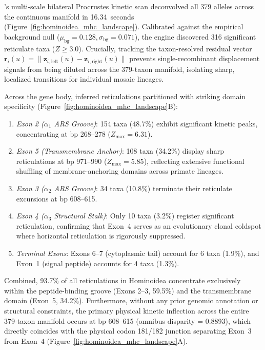 \RhizAeon's multi-scale bilateral Procrustes kinetic scan deconvolved all 379 alleles across the continuous manifold in 16.34~seconds (Figure~\ref{fig:hominoidea_mhc_landscape}).
Calibrated against the empirical background null ($\mu_{\mathrm{bg}} = 0.128, \sigma_{\mathrm{bg}} = 0.071$), the engine discovered 316 significant reticulate taxa ($Z \ge 3.0$).
Crucially, tracking the taxon-resolved residual vector $\mathbf{r}_i(u) = \|\mathbf{z}_{i, \mathrm{left}}(u) - \mathbf{z}_{i, \mathrm{right}}(u)\|$ prevents single-recombinant displacement signals from being diluted across the 379-taxon manifold, isolating sharp, localized transitions for individual mosaic lineages.

Across the gene body, inferred reticulations partitioned with striking domain specificity (Figure~\ref{fig:hominoidea_mhc_landscape}B):
\begin{enumerate}
    \item \textit{Exon 2 ($\alpha_1$ ARS Groove)}: 154 taxa (48.7\%) exhibit significant kinetic peaks, concentrating at bp 268--278 ($Z_{\max} = 6.31$).
    \item \textit{Exon 5 (Transmembrane Anchor)}: 108 taxa (34.2\%) display sharp reticulations at bp 971--990 ($Z_{\max} = 5.85$), reflecting extensive functional shuffling of membrane-anchoring domains across primate lineages.
    \item \textit{Exon 3 ($\alpha_2$ ARS Groove)}: 34 taxa (10.8\%) terminate their reticulate excursions at bp 608--615.
    \item \textit{Exon 4 ($\alpha_3$ Structural Stalk)}: Only 10 taxa (3.2\%) register significant reticulation, confirming that Exon~4 serves as an evolutionary clonal coldspot where horizontal reticulation is rigorously suppressed.
    \item \textit{Terminal Exons}: Exons 6--7 (cytoplasmic tail) account for 6 taxa (1.9\%), and Exon~1 (signal peptide) accounts for 4 taxa (1.3\%).
\end{enumerate}
Combined, 93.7\% of all reticulations in Hominoidea concentrate exclusively within the peptide-binding groove (Exons 2--3, 59.5\%) and the transmembrane domain (Exon~5, 34.2\%).
Furthermore, without any prior genomic annotation or structural constraints, the primary physical kinetic inflection across the entire 379-taxon manifold occurs at bp 608--615 (omnibus disparity = 0.8893), which directly coincides with the physical codon 181/182 junction separating Exon~3 from Exon~4 (Figure~\ref{fig:hominoidea_mhc_landscape}A).

